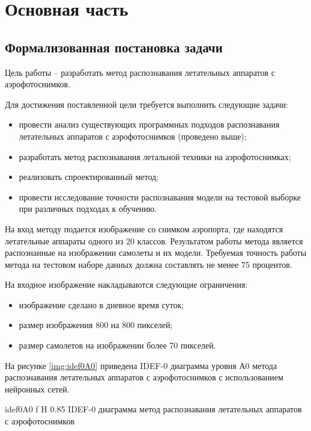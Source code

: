 \chapter{Основная часть}

\section{Формализованная постановка задачи}
Цель работы -- разработать метод распознавания летательных аппаратов с аэрофотоснимков.

Для достижения поставленной цели требуется выполнить следующие задачи:
\begin{itemize}
	\item провести анализ существующих программных подходов распознавания летательных аппаратов с аэрофотоснимков (проведено выше);
	\item разработать метод распознавания летальной техники на аэрофотоснимках;
	\item реализовать спроектированный метод;
	\item провести исследование точности распознавания модели на тестовой выборке при различных подходах к обучению.
\end{itemize}

На вход методу подается изображение со снимком аэропорта, где находятся летательные аппараты одного из 20 классов. Результатом работы метода является распознанные на изображении самолеты и их модели. Требуемая точность работы метода на тестовом наборе данных должна составлять не менее 75 процентов.

На входное изображение накладываются следующие ограничения:
\begin{itemize}
	\item изображение сделано в дневное время суток;
	\item размер изображения 800 на 800 пикселей;
	\item размер самолетов на изображении более 70 пикселей.
\end{itemize}

На рисунке \ref{img:idef0A0} приведена IDEF-0 диаграмма уровня А0 метода распознавания летательных аппаратов с аэрофотоснимков с использованием нейронных сетей.

{idef0A0} %
{f} %
{H} %
{0.85\textwidth} %
{IDEF-0 диаграмма метод распознавания летательных аппаратов с аэрофотоснимков} %

